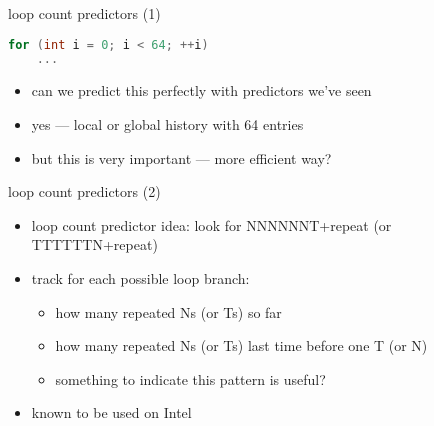\begin{frame}[fragile,label=loopCntPred]{loop count predictors (1)}
\begin{lstlisting}[language=C,style=small]
for (int i = 0; i < 64; ++i)
    ...
\end{lstlisting}
\begin{itemize}
\item can we predict this perfectly with predictors we've seen
\item yes --- local or global history with 64 entries
\vspace{.5cm}
\item but this is very important --- more efficient way?
\end{itemize}
\end{frame}

\begin{frame}[fragile,label=loopCntPred2]{loop count predictors (2)}
\begin{itemize}
\item loop count predictor idea: look for NNNNNNT+repeat (or TTTTTTN+repeat)
\item track for each possible loop branch:
    \begin{itemize}
    \item how many repeated Ns (or Ts) so far
    \item how many repeated Ns (or Ts) last time before one T (or N)
    \item something to indicate this pattern is useful?
    \end{itemize}
\item known to be used on Intel
\end{itemize}
\end{frame}

